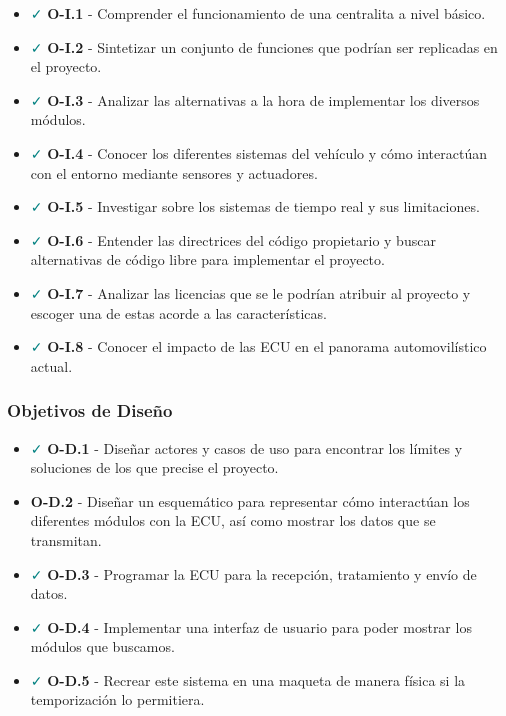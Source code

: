 \begin{itemize}
    \item \textcolor{teal}{\faCheck} \textbf{O-I.1} - Comprender el funcionamiento de una centralita a nivel básico.
    \item \textcolor{teal}{\faCheck}  \textbf{O-I.2} - Sintetizar un conjunto de funciones que podrían ser replicadas en el proyecto.
    \item \textcolor{teal}{\faCheck}  \textbf{O-I.3} - Analizar las alternativas a la hora de implementar los diversos módulos.
    \item \textcolor{teal}{\faCheck}  \textbf{O-I.4} - Conocer los diferentes sistemas del vehículo y cómo interactúan con el entorno mediante sensores y actuadores.
    \item \textcolor{teal}{\faCheck}  \textbf{O-I.5} - Investigar sobre los sistemas de tiempo real y sus limitaciones.
    \item \textcolor{teal}{\faCheck}  \textbf{O-I.6} - Entender las directrices del código propietario y buscar alternativas de código libre para implementar el proyecto.
    \item \textcolor{teal}{\faCheck} \textbf{O-I.7} - Analizar las licencias que se le podrían atribuir al proyecto y escoger una de estas acorde a las características.
    \item \textcolor{teal}{\faCheck} \textbf{O-I.8} - Conocer el impacto de las ECU en el panorama automovilístico actual. 
\end{itemize}

\subsubsection*{Objetivos de Diseño}
\begin{itemize}
    \item \textcolor{teal}{\faCheck}  \textbf{O-D.1} - Diseñar actores y casos de uso para encontrar los límites y soluciones de los que precise el proyecto.
    \item \textcolor{red}{\faRemove}  \textbf{O-D.2} - Diseñar un esquemático para representar cómo interactúan los diferentes módulos con la ECU, así como mostrar los datos que se transmitan.
    \item \textcolor{teal}{\faCheck}  \textbf{O-D.3} - Programar la ECU para la recepción, tratamiento y envío de datos.
    \item \textcolor{teal}{\faCheck}  \textbf{O-D.4} - Implementar una interfaz de usuario para poder mostrar los módulos que buscamos.
    \item \textcolor{teal}{\faCheck}  \textbf{O-D.5} - Recrear este sistema en una maqueta de manera física si la temporización lo permitiera.
\end{itemize}

